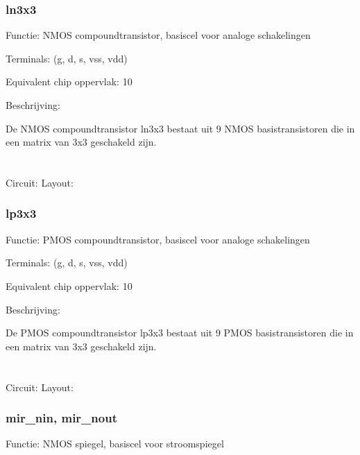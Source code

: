 \subsubsection {ln3x3}

Functie: NMOS compoundtransistor, basiscel voor analoge schakelingen

Terminals: (g, d, s, vss, vdd)

Equivalent chip oppervlak: 10

Beschrijving:

De NMOS compoundtransistor ln3x3 bestaat uit 9 NMOS basistransistoren
die in een matrix van 3x3 geschakeld zijn.\\
\\
\\

Circuit: \hspace{0.5\textwidth} Layout:\\



\clearpage

\subsubsection {lp3x3}

Functie: PMOS compoundtransistor, basiscel voor analoge schakelingen

Terminals: (g, d, s, vss, vdd)

Equivalent chip oppervlak: 10

Beschrijving:

De PMOS compoundtransistor lp3x3 bestaat uit 9 PMOS basistransistoren
die in een matrix van 3x3 geschakeld zijn.\\
\\
\\

Circuit: \hspace{0.5\textwidth} Layout:\\


\clearpage

\subsubsection {mir\_nin, mir\_nout}
Functie: NMOS spiegel, basiscel voor stroomspiegel

